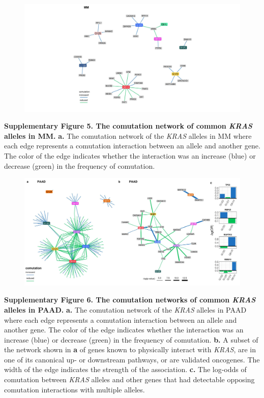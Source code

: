 \documentclass[english, 10pt, letterpaper]{article}
\newcommand{\KRAS}{\emph{KRAS}}
\begin{document}
\begin{figure}[h!]
\centering
\includegraphics[width=180mm]{figures/Supp_Fig_5.jpeg}
\label{sfig:mm-comutation-network}
\end{figure}

\noindent \textbf{Supplementary Figure 5. The comutation network of common \KRAS{} alleles in MM.}
\textbf{a.} The comutation network of the \KRAS{} alleles in MM where each edge represents a comutation interaction between an allele and another gene. The color of the edge indicates whether the interaction was an increase (blue) or decrease (green) in the frequency of comutation.
\newpage


\begin{figure}[h!]
\centering
\includegraphics[width=180mm]{figures/Supp_Fig_6.jpeg}
\label{sfig:paad-comutation-network}
\end{figure}

\noindent \textbf{Supplementary Figure 6. The comutation networks of common \KRAS{} alleles in PAAD.}
\textbf{a.} The comutation network of the \KRAS{} alleles in PAAD where each edge represents a comutation interaction between an allele and another gene. The color of the edge indicates whether the interaction was an increase (blue) or decrease (green) in the frequency of comutation.
\textbf{b.} A subset of the network shown in \textbf{a} of genes known to physically interact with \KRAS{}, are in one of its canonical up- or downstream pathways, or are validated oncogenes. The width of the edge indicates the strength of the association.
\textbf{c.} The log-odds of comutation between \KRAS{} alleles and other genes that had detectable opposing comutation interactions with multiple alleles.
\newpage
\end{document}
